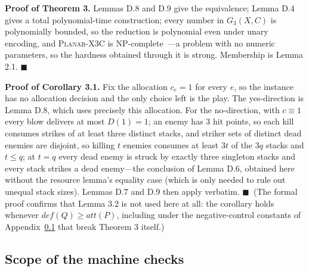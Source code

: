 \documentclass[11pt,a4paper]{article}
\theoremstyle{plain}
\theoremstyle{definition}
\theoremstyle{plain}
\theoremstyle{definition}
\theoremstyle{remark}
\newcommand{\PX}{\textsc{Planar-X3C}}
\newcommand{\qedbox}{\hfill$\blacksquare$}
\begin{document}
\smallskip
{\sloppy
\noindent\textbf{Proof of Theorem 3.} Lemmas D.8 and D.9 give the equivalence; Lemma D.4 gives a
total polynomial-time construction; every number in $G_3(X,C)$ is polynomially bounded, so the
reduction is polynomial even under unary encoding, and \PX{} is NP-complete~\cite{DF86}---a
problem with no numeric parameters, so the hardness obtained through it is strong.
Membership is Lemma 2.1. \qedbox\par}

\smallskip
\noindent\textbf{Proof of Corollary 3.1.} Fix the allocation $c_e=1$ for every $e$, so the
instance has no allocation decision and the only choice left is the play. The yes-direction is
Lemma D.8, which uses precisely this allocation. For the no-direction, with $c\equiv 1$ every blow
delivers at most $D(1)=1$; an enemy has 3 hit points, so each kill consumes strikes of at least
three distinct stacks, and striker sets of distinct dead enemies are disjoint, so killing $t$
enemies consumes at least $3t$ of the $3q$ stacks and $t\le q$; at $t=q$ every dead enemy is
struck by exactly three singleton stacks and every stack strikes a dead enemy---the conclusion of
Lemma D.6, obtained here without the resource lemma's equality case (which is only needed to rule
out unequal stack sizes). Lemmas D.7 and D.9 then apply verbatim. \qedbox\ (The formal proof
confirms that Lemma 3.2 is not used here at all: the corollary holds whenever
$\mathit{def}(Q)\ge\mathit{att}(P)$, including under the negative-control constants of
Appendix~\ref{app:mcscope} that break Theorem 3 itself.)

\subsection{Scope of the machine checks}\label{app:mcscope}
\end{document}
